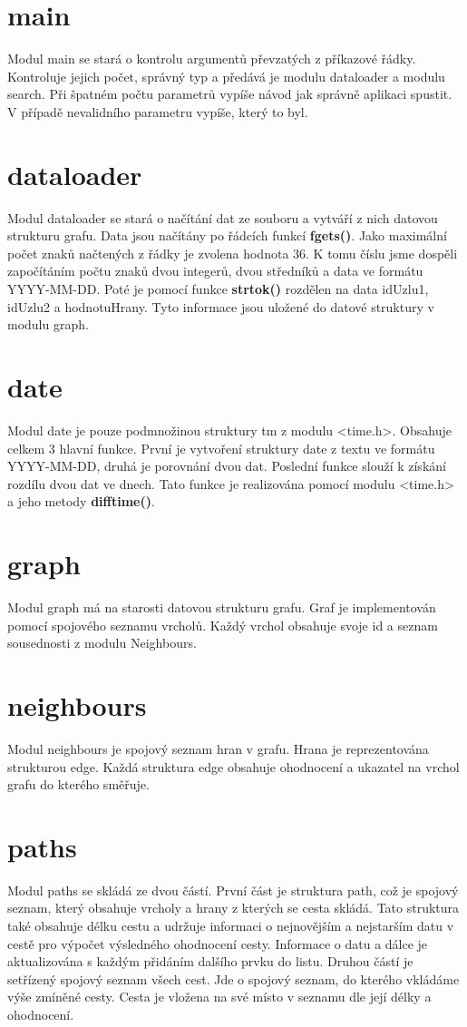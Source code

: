 \section{main}
Modul main se stará o kontrolu argumentů převzatých z příkazové řádky. Kontroluje jejich počet, správný typ a předává je modulu dataloader a modulu search. Při špatném počtu parametrů vypíše návod jak správně aplikaci spustit. V případě nevalidního parametru vypíše, který to byl.

\section{dataloader}
Modul dataloader se stará o načítání dat ze souboru a vytváří z nich datovou strukturu grafu. Data jsou načítány po řádcích funkcí \textbf{fgets()}. Jako maximální počet znaků načtených z řádky je zvolena hodnota 36. K tomu číslu jsme dospěli započítáním počtu znaků dvou integerů, dvou středníků a data ve formátu YYYY-MM-DD. Poté je pomocí funkce \textbf{strtok()} rozdělen na data idUzlu1, idUzlu2 a hodnotuHrany. Tyto informace jsou uložené do datové struktury v modulu graph.

\section{date}
Modul date je pouze podmnožinou struktury tm z modulu <time.h>. Obsahuje celkem 3 hlavní funkce. První je vytvoření struktury date z textu ve formátu YYYY-MM-DD, druhá je porovnání dvou dat. Poslední funkce slouží k získání rozdílu dvou dat ve dnech. Tato funkce je realizována pomocí modulu <time.h> a jeho metody \textbf{difftime()}.

\section{graph}
Modul graph má na starosti datovou strukturu grafu. Graf je implementován pomocí spojového seznamu vrcholů. Každý vrchol obsahuje svoje id a seznam sousednosti z modulu Neighbours.

\section{neighbours}
Modul neighbours je spojový seznam hran v grafu. Hrana je reprezentována strukturou edge. Každá struktura edge obsahuje ohodnocení a ukazatel na vrchol grafu do kterého směřuje.

\section{paths}
Modul paths se skládá ze dvou částí. První část je struktura path, což je spojový seznam, který obsahuje vrcholy a hrany z kterých se cesta skládá. Tato struktura také obsahuje délku cestu a udržuje informaci o nejnovějším a nejstarším datu v cestě pro výpočet výsledného ohodnocení cesty. Informace o datu a dálce je aktualizována s každým přidáním dalšího prvku do listu. Druhou částí je setřízený spojový seznam všech cest. Jde o spojový seznam, do kterého vkládáme výše zmíněné cesty. Cesta je vložena na své místo v seznamu dle její délky a ohodnocení.

